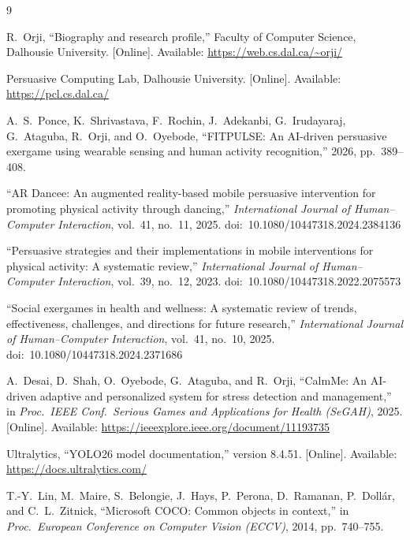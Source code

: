 \documentclass[11pt,a4paper]{article}
\begin{document}
\begin{thebibliography}{9}

R.\ Orji, ``Biography and research profile,'' Faculty of Computer Science,
Dalhousie University. [Online]. Available: \url{https://web.cs.dal.ca/~orji/}

Persuasive Computing Lab, Dalhousie University. [Online]. Available:
\url{https://pcl.cs.dal.ca/}

A.\ S.\ Ponce, K.\ Shrivastava, F.\ Rochin, J.\ Adekanbi, G.\ Irudayaraj,
G.\ Ataguba, R.\ Orji, and O.\ Oyebode, ``FITPULSE: An AI-driven persuasive
exergame using wearable sensing and human activity recognition,'' 2026,
pp.\ 389--408.

``AR Dancee: An augmented reality-based mobile persuasive intervention for
promoting physical activity through dancing,'' \emph{International Journal of
Human--Computer Interaction}, vol.\ 41, no.\ 11, 2025.
doi:\ 10.1080/10447318.2024.2384136

``Persuasive strategies and their implementations in mobile interventions for
physical activity: A systematic review,'' \emph{International Journal of
Human--Computer Interaction}, vol.\ 39, no.\ 12, 2023.
doi:\ 10.1080/10447318.2022.2075573

``Social exergames in health and wellness: A systematic review of trends,
effectiveness, challenges, and directions for future research,''
\emph{International Journal of Human--Computer Interaction}, vol.\ 41, no.\ 10,
2025. doi:\ 10.1080/10447318.2024.2371686

A.\ Desai, D.\ Shah, O.\ Oyebode, G.\ Ataguba, and R.\ Orji, ``CalmMe: An
AI-driven adaptive and personalized system for stress detection and
management,'' in \emph{Proc.\ IEEE Conf.\ Serious Games and Applications for
Health (SeGAH)}, 2025. [Online]. Available:
\url{https://ieeexplore.ieee.org/document/11193735}

Ultralytics, ``YOLO26 model documentation,'' version 8.4.51. [Online].
Available: \url{https://docs.ultralytics.com/}

T.-Y.\ Lin, M.\ Maire, S.\ Belongie, J.\ Hays, P.\ Perona, D.\ Ramanan,
P.\ Doll\'ar, and C.\ L.\ Zitnick, ``Microsoft COCO: Common objects in context,''
in \emph{Proc.\ European Conference on Computer Vision (ECCV)}, 2014,
pp.\ 740--755.


\end{thebibliography}
\end{document}
